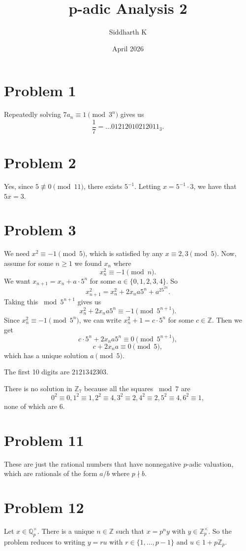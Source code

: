 \documentclass{article}
\title{p-adic Analysis 2}
\author{Siddharth K}
\date{April 2026}
\newcommand{\Z}{\mathbb{Z}}
\newcommand{\Q}{\mathbb{Q}}
\begin{document}
\maketitle

\section*{Problem 1}
Repeatedly solving $7a_n \equiv 1 \pmod{3^n}$ gives us
$$\frac{1}{7} = \ldots 01212010212011_3.$$

\section*{Problem 2}
Yes, since $5 \not\equiv 0 \pmod{11}$, there exists $5^{-1}$. Letting $x = 5^{-1} \cdot 3$, we have that $5x = 3$.

\section*{Problem 3}
We need $x^2 \equiv -1 \pmod{5}$, which is satisfied by any $x \equiv 2, 3 \pmod{5}$. Now, assume for some $n \ge 1$ we found $x_n$ where
$$x_n^2 \equiv -1 \pmod{n}.$$
We want $x_{n + 1} = x_n + a \cdot 5^n$ for some $a \in \{0, 1, 2, 3, 4\}$. So
$$x_{n + 1}^2 = x_n^2 + 2x_na5^n + a^25^{2n}.$$
Taking this $\bmod 5^{n + 1}$ gives us
$$x_n^2 + 2x_na5^n \equiv -1 \pmod{5^{n + 1}}.$$
Since $x_n^2 \equiv -1 \pmod{5^n}$, we can write $x_n^2 + 1 = c\cdot 5^n$ for some $c \in \Z$. Then we get
$$c\cdot 5^n + 2x_na5^n \equiv 0 \pmod{5^{n + 1}},$$
$$c + 2x_na \equiv 0 \pmod{5},$$
which has a unique solution $a \pmod{5}$.

The first 10 digits are $2121342303$.

There is no solution in $\Z_7$ because all the squares $\bmod 7$ are
$$0^2 \equiv 0, 1^2 \equiv 1, 2^2 \equiv 4, 3^2 \equiv 2, 4^2 \equiv 2, 5^2 \equiv 4, 6^2 \equiv 1,$$
none of which are $6$.


\section*{Problem 11}
These are just the rational numbers that have nonnegative $p$-adic valuation, which are rationals of the form $a/b$ where $p \nmid b$.

\section*{Problem 12}
Let $x \in \Q_p^\times$. There is a unique $n \in \Z$ such that $x = p^ny$ with $y \in \Z_p^\times$. So the problem reduces to writing $y = ru$ with $r \in \{1, \ldots, p - 1\}$ and $u \in 1 + p\Z_p$.
\end{document}
